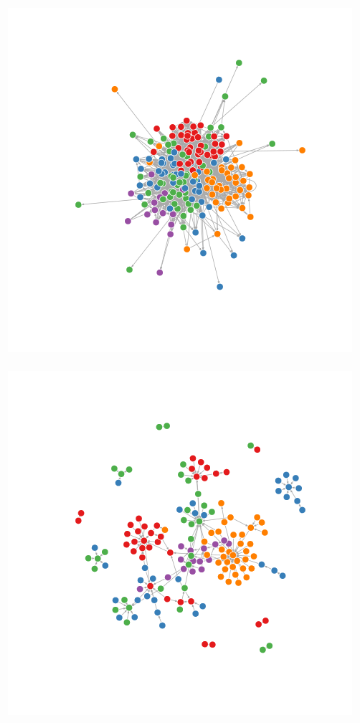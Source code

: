 \documentclass[runningheads,a4paper]{llncs}
\begin{document}
\begin{figure}%
\centering
\begin{subfigure}{.3\linewidth}
\label{fig:grafo_2011-a}%
\includegraphics[width=\linewidth]{grafo_2011_1_pcnt}%
\end{subfigure}%
\begin{subfigure}{.3\linewidth}
\label{fig:grafo_2011-c}%
\includegraphics[width=\linewidth]{grafo_2011_15_pcnt}%

\end{subfigure}
\end{figure}
\end{document}

